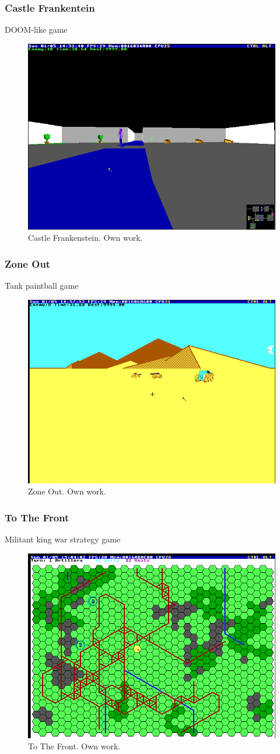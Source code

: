 \documentclass{beamer}
\begin{document}
	\begin{frame}
		\frametitle{Castle Frankentein}
		DOOM-like game
		\begin{figure}
			\centering
			\includegraphics[width=0.6\linewidth]{images/castle_frankenstein.png}
			\caption{Castle Frankenstein. Own work.}
			\label{fig:castle_frankenstein}
		\end{figure}
	\end{frame}

	\begin{frame}
		\frametitle{Zone Out}
		Tank paintball game
		\begin{figure}
			\centering
			\includegraphics[width=0.6\linewidth]{images/zone_out.png}
			\caption{Zone Out. Own work.}
			\label{fig:zone_out}
		\end{figure}
	\end{frame}

	\begin{frame}
		\frametitle{To The Front}
		Militant king war strategy game
		\begin{figure}
			\centering
			\includegraphics[width=0.6\linewidth]{images/to_the_front.png}
			\caption{To The Front. Own work.}
			\label{fig:to_the_front}
		\end{figure}
	\end{frame}
\end{document}
